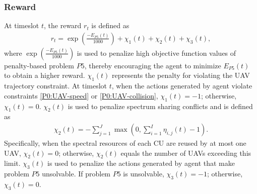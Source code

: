 \documentclass[10pt,journal,compsoc]{IEEEtran}
\begin{document}
\subsubsection{Reward}
At timeslot $t$, the reward $r_{t}$ is defined as
\begin{align}\label{c5:Reward-Function}
    r_{t} = \exp\left(\frac{-E_{P5}(t)}{1000}\right) + \chi_{1}(t) + \chi_{2}(t) + \chi_{3}(t),
\end{align}
where $\exp\left(\frac{-E_{P5}(t)}{1000}\right)$ is used to penalize high objective function values of penalty-based problem $P5$, thereby encouraging the agent to minimize $E_{P5}(t)$ to obtain a higher reward.
$\chi_{1}(t)$ represents the penalty for violating the UAV trajectory constraint. 
At timeslot $t$, when the actions generated by agent violate constraints \eqref{P0:UAV-speed} or \eqref{P0:UAV-collision}, $\chi_{1}(t) = -1$; otherwise, $\chi_{1}(t) = 0$.
$\chi_{2}(t)$ is used to penalize spectrum sharing conflicts and is defined as
\begin{align}
    \chi_2(t) = -\sum_{j=1}^{J} \max\left(0, \sum_{i=1}^{I} \eta_{i,j}(t) - 1\right).
\end{align}
Specifically, when the spectral resources of each CU are reused by at most one UAV, $\chi_2(t) = 0$; otherwise, $\chi_2(t)$ equals the number of UAVs exceeding this limit. 
$\chi_{3}(t)$ is used to penalize the actions generated by agent that make problem $P5$ unsolvable. 
If problem $P5$ is unsolvable, $\chi_{3}(t) = -1$; otherwise, $\chi_{3}(t) = 0$.  
\end{document}
